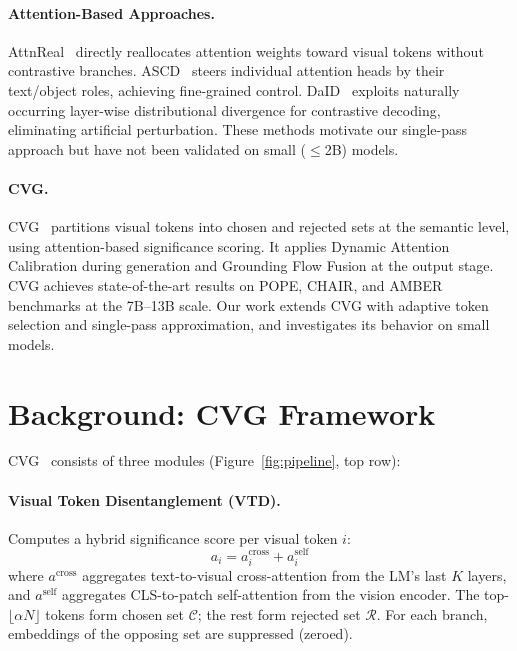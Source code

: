 \documentclass[10pt,twocolumn]{article}
\begin{document}
\paragraph{Attention-Based Approaches.}
AttnReal~\cite{attnreal} directly reallocates attention weights toward visual tokens without contrastive branches. ASCD~\cite{ascd} steers individual attention heads by their text/object roles, achieving fine-grained control. DaID~\cite{daid2025} exploits naturally occurring layer-wise distributional divergence for contrastive decoding, eliminating artificial perturbation. These methods motivate our single-pass approach but have not been validated on small ($\leq$2B) models.

\paragraph{CVG.}
CVG~\cite{fu2025cvg} partitions visual tokens into chosen and rejected sets at the semantic level, using attention-based significance scoring. It applies Dynamic Attention Calibration during generation and Grounding Flow Fusion at the output stage. CVG achieves state-of-the-art results on POPE, CHAIR, and AMBER benchmarks at the 7B--13B scale. Our work extends CVG with adaptive token selection and single-pass approximation, and investigates its behavior on small models.

\section{Background: CVG Framework}

CVG~\cite{fu2025cvg} consists of three modules (Figure~\ref{fig:pipeline}, top row):

\paragraph{Visual Token Disentanglement (VTD).} Computes a hybrid significance score per visual token $i$:
\begin{equation}
a_i = a_i^{\text{cross}} + a_i^{\text{self}} \label{eq:vtd}
\end{equation}
where $a^{\text{cross}}$ aggregates text-to-visual cross-attention from the LM's last $K$ layers, and $a^{\text{self}}$ aggregates CLS-to-patch self-attention from the vision encoder. The top-$\lfloor\alpha N\rfloor$ tokens form chosen set $\mathcal{C}$; the rest form rejected set $\mathcal{R}$. For each branch, embeddings of the opposing set are suppressed (zeroed).
\end{document}
